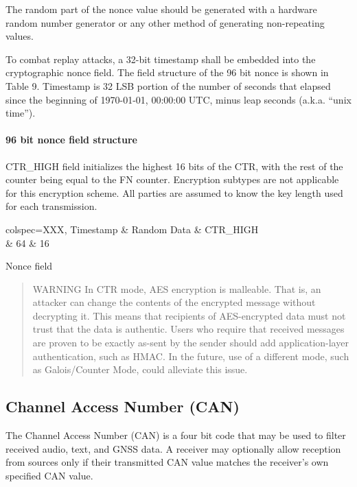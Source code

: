 \documentclass[a4paper,11pt]{book}
\begin{document}
The random part of the nonce value should be generated with a hardware random number generator or any other method of generating non-repeating values.

To combat replay attacks, a 32-bit timestamp shall be embedded into the cryptographic nonce field. The field structure of the 96 bit nonce is shown in Table 9. Timestamp is 32 LSB portion of the number of seconds that elapsed since the beginning of 1970-01-01, 00:00:00 UTC, minus leap seconds (a.k.a. ``unix time'').

\paragraph{96 bit nonce field structure}

CTR\_HIGH field initializes the highest 16 bits of the CTR, with the rest of the counter being equal to the FN counter. Encryption subtypes are not applicable for this encryption scheme. All parties are assumed to know the key length used for each transmission.

\begin{table}[h]
	\centering
	\begin{tblr}{
		colspec={XXX},
		}
		\hline
		Timestamp & Random Data & CTR\_HIGH \\
		 & 64 & 16 \\
		\hline[2px]
	\end{tblr}
	\caption{Nonce field}
\end{table}

\begin{quote}
	WARNING In CTR mode, AES encryption is malleable. That is, an attacker can change the contents of the encrypted message without decrypting it. This means that recipients of AES-encrypted data must not trust that the data is authentic. Users who require that received messages are proven to be exactly as-sent by the sender should add application-layer authentication, such as HMAC. In the future, use of a different mode, such as Galois/Counter Mode, could alleviate this issue.
\end{quote}

\subsection{Channel Access Number (CAN)}

The Channel Access Number (CAN) is a four bit code that may be used to filter received audio, text, and GNSS data. A receiver may optionally allow reception from sources only if their transmitted CAN value matches the receiver's own specified CAN value.
\end{document}
